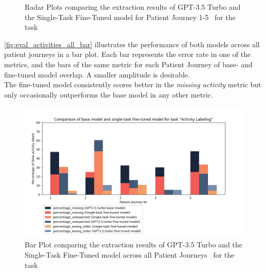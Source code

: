 \begin{figure}
  \caption{Radar Plots comparing the extraction results of GPT-3.5 Turbo and the Single-Task Fine-Tuned model for Patient Journey 1-5~ for the task }
  \label{fig:eval_activities_single_rad}
\end{figure}
\autoref{fig:eval_activities_all_bar} illustrates the performance of both models across all patient journeys in a bar plot. Each bar represents the error rate in one of the metrics, and the bars of the same metric for each Patient Journey of base- and fine-tuned model overlap. A smaller amplitude is desirable. \\
The fine-tuned model consistently scores better in the \emph{missing activity} metric but only occasionally outperforms the base model in any other metric. 
\begin{figure}
    \centering
    \includegraphics[width=\textwidth]{bachelor_thesis/images/activites_all-single.png}
    \caption{Bar Plot comparing the extraction results of GPT-3.5 Turbo and the Single-Task Fine-Tuned model across all Patient Journeys~ for the task } 
    \label{fig:eval_activities_all_bar}
\end{figure}

